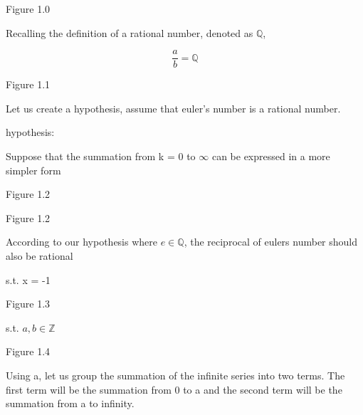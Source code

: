 \documentclass[12pt, a4paper]{article}
\begin{document}
\raggedleft

{\small Figure 1.0}

\centering
\vspace{0.5cm}



Recalling the definition of a rational number, denoted as $\mathbb{Q}$,

\vspace{0.5cm}
{\fontsize{17.28}{18pt}\selectfont
\[
\frac{a}{b} = \mathbb{Q}
\]
}

\raggedleft

{\small Figure 1.1}

\vspace{0.5cm}
\raggedright

Let us create a hypothesis, assume that euler's number is a rational number.
\newline

hypothesis: \centering {\fontsize{17.28}{18pt}\selectfont
\[e \in \mathbb{Q}
\]
}

\raggedright%

Suppose that the summation from k = 0 to $\infty$ can be expressed in a more simpler form

\centering{\fontsize{17.28pt}{18pt}\selectfont
\[ \sum_{k=0}^\infty \frac{1}{k!} = \frac{1}{0!} + \frac{1}{1!} + \frac{1}{2!} ... + \frac{1}{k!} = \frac{a}{b}
\]
}

\raggedleft

{\small Figure 1.2}

\centering{\fontsize{17.28pt}{18pt}\selectfont
\[ e = \frac{a}{b}
\]
}
\raggedleft

{\small Figure 1.2}

\vspace{0.5cm}

\raggedright

According to our hypothesis where $e \in \mathbb{Q}$, the reciprocal of eulers number
should also be rational

\centering{\fontsize{17.28pt}{18pt}\selectfont
\[ e = \frac{a}{b} \quad = \quad e^{x} = \frac{b}{a}
\]
} s.t. x = -1

\raggedleft
{\small Figure 1.3}

\centering{\fontsize{17.28pt}{18pt}\selectfont
\[ e^{-1} = \frac{1}{e} = \frac{b}{a} = \sum_{k=0}^\infty \frac{(-1)^{k}}{k!}
\]
} s.t. $a,b \in \mathbb{Z}$

\raggedleft
{\small Figure 1.4}

\raggedright

Using a, let us group the summation of the infinite series into two terms. The first term will be the summation from 0 to a and the second 
term will be the summation from a to infinity. 
\end{document}
